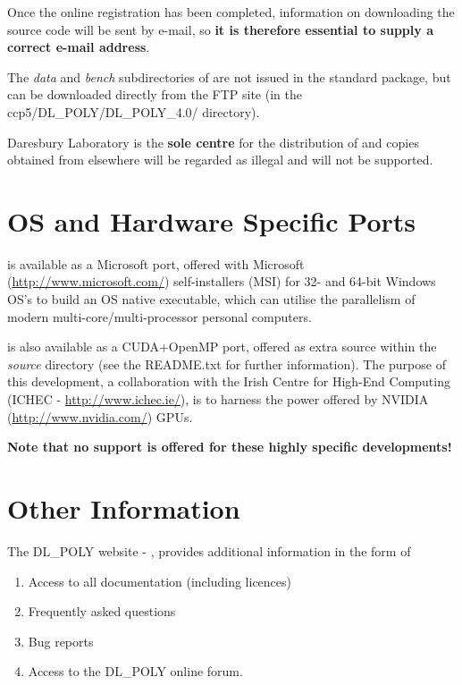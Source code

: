 Once the online registration has been completed, information
on downloading the \D source code will be sent by e-mail, so {\bf
it is therefore essential to supply a correct e-mail address}.

The {\em data} and {\em bench} subdirectories of \D are not issued
in the standard package, but can be downloaded directly from the
FTP site (in the \mbox{ccp5/DL\_POLY/DL\_POLY\_4.0/} directory).

 Daresbury Laboratory is the {\bf sole centre} for
the distribution of \D and copies obtained from elsewhere will be
regarded as illegal and will not be supported.

\section{OS and Hardware Specific Ports}

\D is available as a Microsoft port, offered with Microsoft\textregistered
(\href{http://www.microsoft.com/}{http://www.microsoft.com/})
self-installers (MSI) for 32- and 64-bit Windows OS's to build
an OS native executable, which can utilise the parallelism of
modern multi-core/multi-processor personal computers.

\D is also available as a CUDA+OpenMP port, offered as extra
source within the {\em source} directory (see the README.txt
for further information).  The purpose of this development,
a collaboration with the Irish Centre for High-End Computing
(ICHEC - \href{http://www.ichec.ie/}{http://www.ichec.ie/}),
is to harness the power offered by NVIDIA\textregistered
(\href{http://www.nvidia.com/}{http://www.nvidia.com/}) GPUs.

{\bf Note that no support is offered for these highly specific
developments!}

\section{Other Information}

The DL\_POLY website - \WEB{},
provides additional information in the form of
\begin{enumerate}
\item Access to all documentation (including licences)
\item Frequently asked questions
\item Bug reports
\item Access to the DL\_POLY online forum.
\end{enumerate}

